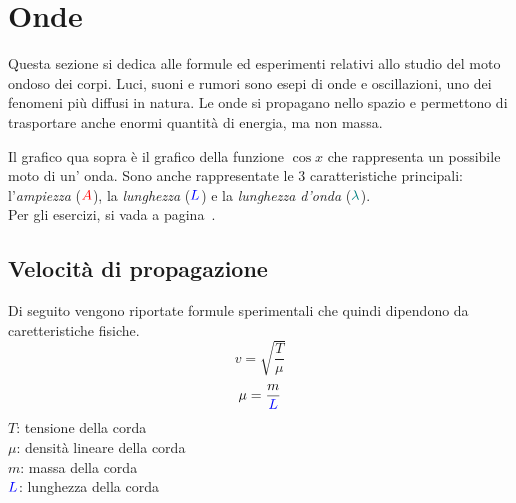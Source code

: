 
\section{Onde}\label{sec:onde}
Questa sezione si dedica alle formule ed esperimenti relativi allo studio del moto ondoso dei 
corpi. Luci, suoni e rumori sono esepi di onde e oscillazioni, uno dei fenomeni più diffusi in
natura. Le onde si propagano nello spazio e permettono di trasportare anche enormi quantità di
energia, ma non massa.

\begin{center}
\end{center}
Il grafico qua sopra è il grafico della funzione $\cos x$ che rappresenta un possibile moto di un'
onda. Sono anche rappresentate le 3 caratteristiche principali: l'\emph{ampiezza}
($\mathcolor{red}{A}$), la \emph{lunghezza} ($\mathcolor{blue}{L}$) e la \emph{lunghezza d'onda}
($\mathcolor{teal}{\lambda}$).\\[\baselineskip]
Per gli esercizi, si vada a pagina~\pageref{ex:onde}.

\subsection{Velocità di propagazione} \label{subsec:onde:sper}
Di seguito vengono riportate formule sperimentali che quindi dipendono da caretteristiche fisiche.
\begin{equation*}
  v = \sqrt{\frac{T}{\mu}}
\end{equation*}
\begin{equation*}
  \mu = \frac{m}{\mathcolor{blue}{L}}
\end{equation*}
$T$: tensione della corda\\
$\mu$: densità lineare della corda\\
$m$: massa della corda\\
$\mathcolor{blue}{L}$: lunghezza della corda

